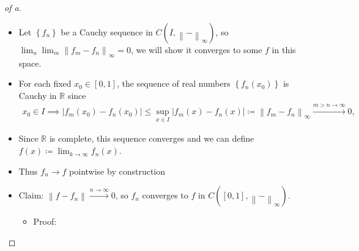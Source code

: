 \begin{solution}

\envlist

\begin{proof}[of a]

\envlist

\begin{itemize}
\item
  Let \(\left\{{f_n}\right\}\) be a Cauchy sequence in
  \(C(I, {\left\lVert {{-}} \right\rVert}_\infty)\), so
  \(\lim_n\lim_m {\left\lVert {f_m - f_n} \right\rVert}_\infty = 0\), we
  will show it converges to some \(f\) in this space.
\item
  For each fixed \(x_0 \in [0, 1]\), the sequence of real numbers
  \(\left\{{f_n(x_0)}\right\}\) is Cauchy in \({\mathbb{R}}\) since
  \begin{align*}
  x_0\in I \implies {\left\lvert {f_m(x_0) - f_n(x_0)} \right\rvert} \leq \sup_{x\in I} {\left\lvert {f_m(x) - f_n(x)} \right\rvert} \coloneqq{\left\lVert {f_m - f_n} \right\rVert}_\infty \overset{m>n\to\infty}\to 0,
  \end{align*}
\item
  Since \({\mathbb{R}}\) is complete, this sequence converges and we can
  define \(f(x) \coloneqq\lim_{k\to \infty} f_n(x)\).
\item
  Thus \(f_n\to f\) pointwise by construction
\item
  Claim:
  \({\left\lVert {f - f_n} \right\rVert} \overset{n\to\infty}\to 0\), so
  \(f_n\) converges to \(f\) in
  \(C([0, 1], {\left\lVert {{-}} \right\rVert}_\infty)\).

  \begin{itemize}
  \tightlist
  \item
    Proof:


\end{itemize}
\end{itemize}
\end{proof}
\end{solution}
